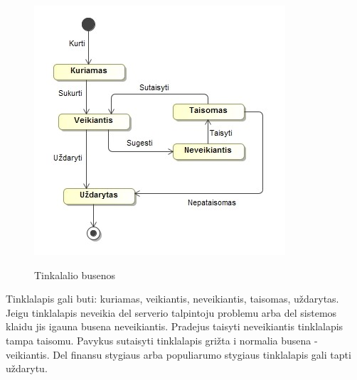 ﻿\documentclass{VUMIFPSkursinis}
\begin{document}
\begin{figure}[H]
    \centering
    \includegraphics[scale=0.8]{img/geri/Tinkalalio_Busenos.jpg}
    \label{img:uml20}
	\caption{Tinkalalio busenos}
\end{figure}
Tinklalapis gali buti: kuriamas, veikiantis, neveikiantis, taisomas, uždarytas. Jeigu tinklalapis neveikia del serverio talpintoju problemu arba del sistemos klaidu jis igauna busena neveikiantis. Pradejus taisyti neveikiantis tinklalapis tampa taisomu. Pavykus sutaisyti tinklalapis grižta i normalia busena - veikiantis. Del finansu stygiaus arba populiarumo stygiaus tinklalapis gali tapti uždarytu.
\end{document}
